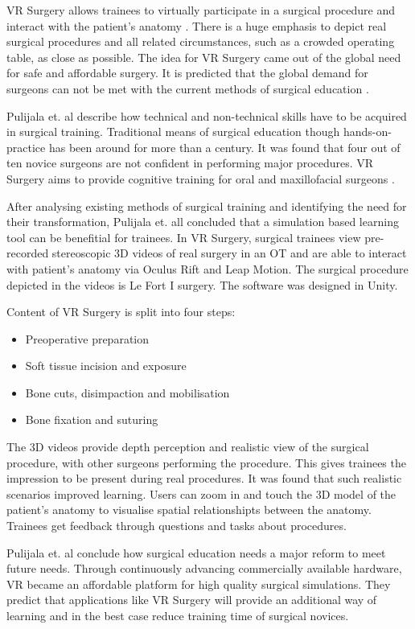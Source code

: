 VR Surgery allows trainees to virtually participate in a surgical procedure and interact with the patient's anatomy \cite{RN6}.
There is a huge emphasis to depict real surgical procedures and all related circumstances, such as a crowded operating table, as close as possible.
The idea for VR Surgery came out of the global need for safe and affordable surgery.
It is predicted that the global demand for surgeons can not be met with the current methods of surgical education \cite{RN68}.

Pulijala et. al describe how technical and non-technical skills have to be acquired in surgical training.
Traditional means of surgical education though hands-on-practice has been around for more than a century.
It was found that four out of ten novice surgeons are not confident in performing major procedures.
VR Surgery aims to provide cognitive training for oral and maxillofacial surgeons \cite{RN68}.

After analysing existing methods of surgical training and identifying the need for their transformation,
Pulijala et. all concluded that a simulation based learning tool can be benefitial for trainees.
In VR Surgery, surgical trainees view pre-recorded stereoscopic 3D videos of real surgery in an OT and are able to interact with patient's anatomy via Oculus Rift and Leap Motion.
The surgical procedure depicted in the videos is Le Fort I surgery.
The software was designed in Unity.

Content of VR Surgery is split into four steps:
\begin{itemize}
    \item Preoperative preparation
    \item Soft tissue incision and exposure
    \item Bone cuts, disimpaction and mobilisation
    \item Bone fixation and suturing
\end{itemize}

The 3D videos provide depth perception and realistic view of the surgical procedure, with other surgeons performing the procedure.
This gives trainees the impression to be present during real procedures. It was found that such realistic scenarios improved learning.
Users can zoom in and touch the 3D model of the patient's anatomy to visualise spatial relationshipts between the anatomy.
Trainees get feedback through questions and tasks about procedures.

Pulijala et. al conclude how surgical education needs a major reform to meet future needs.
Through continuously advancing commercially available hardware, VR became an affordable platform for high quality surgical simulations.
They predict that applications like VR Surgery will provide an additional way of learning and in the best case reduce training time of surgical novices.

